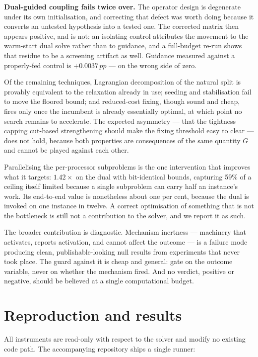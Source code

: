\documentclass[11pt,a4paper]{article}
\newcommand{\pp}{\,pp}
\begin{document}
\textbf{Dual-guided coupling fails twice over.} The operator design is
degenerate under its own
initialisation, and correcting that defect was worth doing because it converts an
untested hypothesis into a tested one. The corrected matrix then appears positive,
and is not: an isolating control attributes the movement to the warm-start dual
solve rather than to guidance, and a full-budget re-run shows that residue to be a
screening artifact as well. Guidance measured against a properly-fed control is
$+0.0037\pp$ --- on the wrong side of zero.

Of the remaining techniques, Lagrangian decomposition of the natural split is
provably equivalent to the relaxation already in use; seeding and stabilisation
fail to move the floored bound; and reduced-cost fixing, though sound and cheap,
fires only once the incumbent is already essentially optimal, at which point no
search remains to accelerate. The expected asymmetry --- that the tightness capping
cut-based strengthening should make the fixing threshold easy to clear --- does not
hold, because both properties are consequences of the same quantity $G$ and cannot
be played against each other.

Parallelising the per-processor subproblems is the one intervention that improves
what it targets: $1.42\times$ on the dual with bit-identical bounds, capturing
59\% of a ceiling itself limited because a single subproblem can carry half an
instance's work. Its end-to-end value is nonetheless about one per cent, because
the dual is invoked on one instance in twelve. A correct optimisation of something
that is not the bottleneck is still not a contribution to the solver, and we
report it as such.

The broader contribution is diagnostic. Mechanism inertness --- machinery that
activates, reports activation, and cannot affect the outcome --- is a failure mode
producing clean, publishable-looking null results from experiments that never took
place. The guard against it is cheap and general: gate on the outcome variable,
never on whether the mechanism fired. And no verdict, positive or negative, should
be believed at a single computational budget.

\appendix

\section{Reproduction and results}\label{app:repro}

All instruments are read-only with respect to the solver and modify no existing
code path. The accompanying repository ships a single runner:
\end{document}
